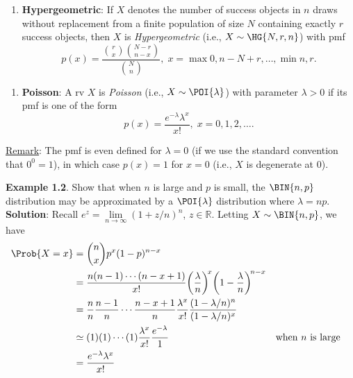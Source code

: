 \begin{Regular}
    \begin{enumerate}[6.]
        \item \textbf{Hypergeometric}: If $ X $ denotes the number of success objects in $ n $ draws without
              replacement from a finite population of size $ N $ containing exactly $ r $ success objects, then $ X $ is
              \emph{Hypergeometric} (i.e., $ X \sim \HG{N,r,n}$) with pmf
              \[ p(x)=\frac{\binom{r}{x}\binom{N-r}{n-x}}{\binom{N}{n}},\;x=\max{0,n-N+r},\ldots,\min{n,r}.  \]
    \end{enumerate}
\end{Regular}
\begin{Regular}
    \begin{enumerate}[7.]
        \item \textbf{Poisson}: A rv $ X $ is \emph{Poisson} (i.e., $ X \sim \POI{\lambda} $) with parameter $ \lambda>0 $ if its pmf is one of the form
              \[ p(x)=\frac{e^{-\lambda}\lambda^x}{x!},\;x=0,1,2,\ldots.  \]
    \end{enumerate}
    \tcblower{}
    \underline{Remark}: The pmf is even defined for $ \lambda=0 $ (if we use the standard convention that $ 0^0=1 $), in which case $ p(x)=1 $ for $ x=0 $
    (i.e., $ X $ is degenerate at $ 0 $).
\end{Regular}
\begin{Example}
    \textbf{Example 1.2}. Show that when $ n $ is large and $ p $ is small, the $ \BIN{n,p} $ distribution may be approximated by a
    $ \POI{\lambda} $ distribution where $ \lambda=np $.
    \tcblower{}
    \textbf{Solution}:
    Recall $ e^z=\lim\limits_{{n} \to {\infty}} (1+z/n)^n $, $ z\in\mathbb{R} $. Letting $ X \sim \BIN{n,p} $, we have
    \begin{align*}
        \Prob{X=x}
         & =\binom{n}{x}p^x(1-p)^{n-x}                                                                                                                      \\
         & =\frac{n(n-1)\cdots(n-x+1)}{x!}\biggl(\frac{\lambda}{n} \biggr)^{\!x} \biggl(1-\frac{\lambda}{n} \biggr)^{\!n-x}                                 \\
         & =\frac{n}{n}\frac{n-1}{n}\cdots \frac{n-x+1}{n} \frac{\lambda^x}{x!} \frac{(1-\lambda/n)^n}{(1-\lambda/n)^x}                                     \\
         & \simeq (1)(1)\cdots(1)\frac{\lambda^x}{x!}\frac{e^{-\lambda}}{1}                                                 &  & \text{when $ n $ is large} \\
         & =\frac{e^{-\lambda}\lambda^x}{x!}
    \end{align*}
\end{Example}
